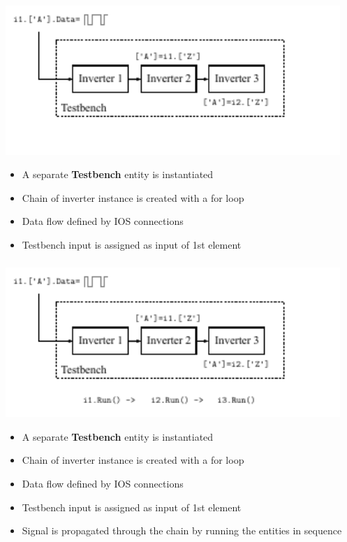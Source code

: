 \documentclass{sdkslides}
\begin{document}
\begin{frame}[t]
    \frametitle{\sectionname}
    \begin{center}
        \includegraphics[width=0.95\textwidth]{Pics/inverter_chain_3}
    \end{center}
    \begin{itemize}
        \item A separate \textbf{Testbench} entity is instantiated
        \item Chain of inverter instance is created with a for loop
        \item Data flow defined by IOS connections
        \item Testbench input is assigned as input of 1st element
    \end{itemize}
\end{frame}

\begin{frame}[t]
    \frametitle{\sectionname}
    \begin{center}
        \includegraphics[width=0.95\textwidth]{Pics/inverter_chain_4}
    \end{center}
    \begin{itemize}
        \item A separate \textbf{Testbench} entity is instantiated
        \item Chain of inverter instance is created with a for loop
        \item Data flow defined by IOS connections
        \item Testbench input is assigned as input of 1st element
        \item Signal is propagated through the chain by running the entities
            in sequence
    \end{itemize}
\end{frame}
\end{document}
